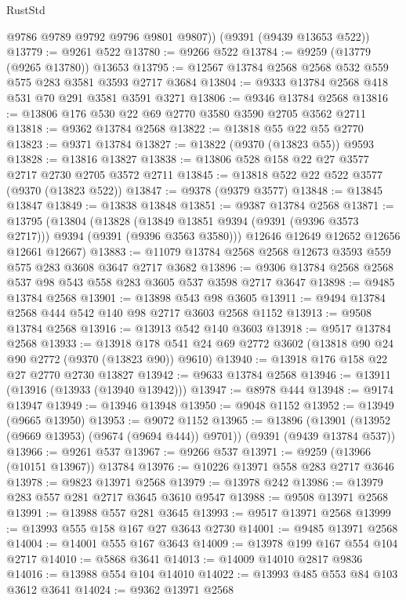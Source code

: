\begin{lexlean}{RustStd}
\begin{coremodule}
        @9786
        @9789
        @9792
        @9796
        @9801
        @9807))
    (@9391 (@9439 @13653 @522))
@13779 := @9261 @522
@13780 := @9266 @522
@13784 := @9259 (@13779 (@9265 @13780)) @13653
@13795 := @12567 @13784 @2568 @2568 @532 @559 @575 @283 @3581 @3593 @2717 @3684
@13804 := @9333 @13784 @2568 @418 @531 @70 @291 @3581 @3591 @3271
@13806 := @9346 @13784 @2568
@13816 := @13806 @176 @530 @22 @69 @2770 @3580 @3590 @2705 @3562 @2711
@13818 := @9362 @13784 @2568
@13822 := @13818 @55 @22 @55 @2770
@13823 := @9371 @13784
@13827 := @13822 (@9370 (@13823 @55)) @9593
@13828 := @13816 @13827
@13838 := @13806 @528 @158 @22 @27 @3577 @2717 @2730 @2705 @3572 @2711
@13845 := @13818 @522 @22 @522 @3577 (@9370 (@13823 @522))
@13847 := @9378 (@9379 @3577)
@13848 := @13845 @13847
@13849 := @13838 @13848
@13851 := @9387 @13784 @2568
@13871 := @13795
    (@13804
      (@13828 (@13849 @13851 @9394 (@9391 (@9396 @3573 @2717))) @9394 (@9391 (@9396 @3563 @3580)))
      @12646
      @12649
      @12652
      @12656
      @12661
      @12667)
@13883 := @11079 @13784 @2568 @2568 @12673 @3593 @559 @575 @283 @3608 @3647 @2717 @3682
@13896 := @9306 @13784 @2568 @2568 @537 @98 @543 @558 @283 @3605 @537 @3598 @2717 @3647
@13898 := @9485 @13784 @2568
@13901 := @13898 @543 @98 @3605
@13911 := @9494 @13784 @2568 @444 @542 @140 @98 @2717 @3603 @2568 @1152
@13913 := @9508 @13784 @2568
@13916 := @13913 @542 @140 @3603
@13918 := @9517 @13784 @2568
@13933 := @13918 @178 @541 @24 @69 @2772 @3602 (@13818 @90 @24 @90 @2772 (@9370 (@13823 @90)) @9610)
@13940 := @13918 @176 @158 @22 @27 @2770 @2730 @13827
@13942 := @9633 @13784 @2568
@13946 := @13911 (@13916 (@13933 (@13940 @13942)))
@13947 := @8978 @444
@13948 := @9174 @13947
@13949 := @13946 @13948
@13950 := @9048 @1152
@13952 := @13949 (@9665 @13950)
@13953 := @9072 @1152
@13965 := @13896
    (@13901 (@13952 (@9669 @13953) (@9674 (@9694 @444)) @9701))
    (@9391 (@9439 @13784 @537))
@13966 := @9261 @537
@13967 := @9266 @537
@13971 := @9259 (@13966 (@10151 @13967)) @13784
@13976 := @10226 @13971 @558 @283 @2717 @3646
@13978 := @9823 @13971 @2568
@13979 := @13978 @242
@13986 := @13979 @283 @557 @281 @2717 @3645 @3610 @9547
@13988 := @9508 @13971 @2568
@13991 := @13988 @557 @281 @3645
@13993 := @9517 @13971 @2568
@13999 := @13993 @555 @158 @167 @27 @3643 @2730
@14001 := @9485 @13971 @2568
@14004 := @14001 @555 @167 @3643
@14009 := @13978 @199 @167 @554 @104 @2717
@14010 := @5868 @3641
@14013 := @14009 @14010 @2817 @9836
@14016 := @13988 @554 @104 @14010
@14022 := @13993 @485 @553 @84 @103 @3612 @3641
@14024 := @9362 @13971 @2568

\end{coremodule}
\end{lexlean}
